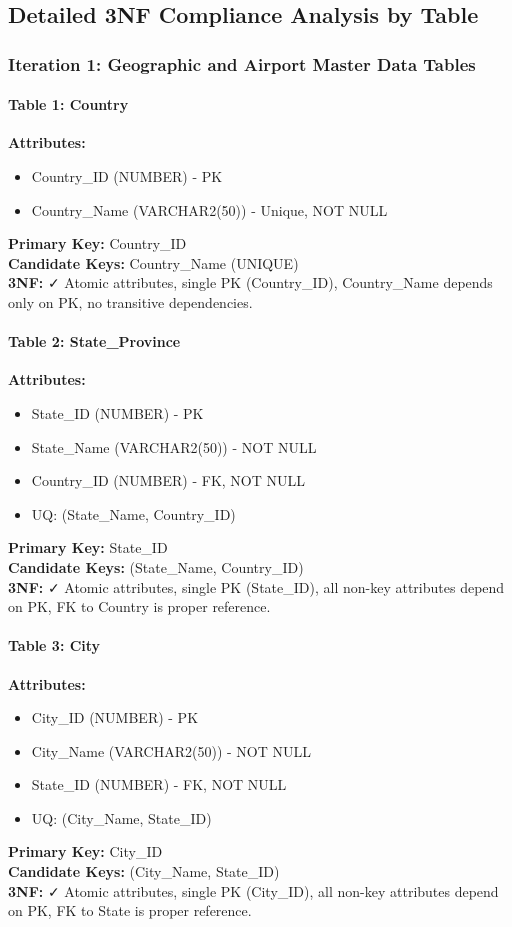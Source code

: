 \documentclass[12pt,a4paper,openany]{report}
\begin{document}
\subsection{Detailed 3NF Compliance Analysis by Table}

\subsubsection{Iteration 1: Geographic and Airport Master Data Tables}

\paragraph{Table 1: Country}
\textbf{Attributes:} 
\begin{itemize}
    \item Country\_ID (NUMBER) - PK
    \item Country\_Name (VARCHAR2(50)) - Unique, NOT NULL
\end{itemize}
\textbf{Primary Key:} Country\_ID\\
\textbf{Candidate Keys:} Country\_Name (UNIQUE)\\
\textbf{3NF:} ✓ Atomic attributes, single PK (Country\_ID), Country\_Name depends only on PK, no transitive dependencies.

\paragraph{Table 2: State\_Province}
\textbf{Attributes:} 
\begin{itemize}
    \item State\_ID (NUMBER) - PK
    \item State\_Name (VARCHAR2(50)) - NOT NULL
    \item Country\_ID (NUMBER) - FK, NOT NULL
    \item UQ: (State\_Name, Country\_ID)
\end{itemize}
\textbf{Primary Key:} State\_ID\\
\textbf{Candidate Keys:} (State\_Name, Country\_ID)\\
\textbf{3NF:} ✓ Atomic attributes, single PK (State\_ID), all non-key attributes depend on PK, FK to Country is proper reference.

\paragraph{Table 3: City}
\textbf{Attributes:} 
\begin{itemize}
    \item City\_ID (NUMBER) - PK
    \item City\_Name (VARCHAR2(50)) - NOT NULL
    \item State\_ID (NUMBER) - FK, NOT NULL
    \item UQ: (City\_Name, State\_ID)
\end{itemize}
\textbf{Primary Key:} City\_ID\\
\textbf{Candidate Keys:} (City\_Name, State\_ID)\\
\textbf{3NF:} ✓ Atomic attributes, single PK (City\_ID), all non-key attributes depend on PK, FK to State is proper reference.
\end{document}
